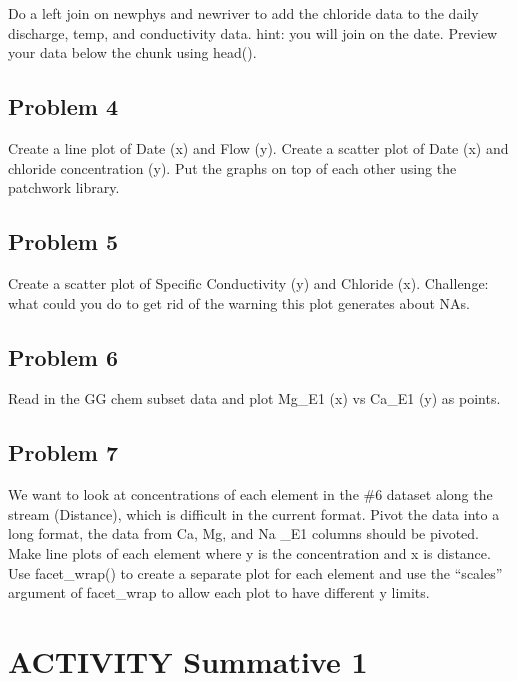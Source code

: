 \documentclass[
]{book}
\begin{document}
Do a left join on newphys and newriver to add the chloride data to the daily discharge, temp, and conductivity data. hint: you will join on the date. Preview your data below the chunk using head().

\hypertarget{problem-4-2}{%
\section{Problem 4}\label{problem-4-2}}

Create a line plot of Date (x) and Flow (y). Create a scatter plot of Date (x) and chloride concentration (y). Put the graphs on top of each other using the patchwork library.

\hypertarget{problem-5-2}{%
\section{Problem 5}\label{problem-5-2}}

Create a scatter plot of Specific Conductivity (y) and Chloride (x). Challenge: what could you do to get rid of the warning this plot generates about NAs.

\hypertarget{problem-6-2}{%
\section{Problem 6}\label{problem-6-2}}

Read in the GG chem subset data and plot Mg\_E1 (x) vs Ca\_E1 (y) as points.

\hypertarget{problem-7}{%
\section{Problem 7}\label{problem-7}}

We want to look at concentrations of each element in the \#6 dataset along the stream (Distance), which is difficult in the current format. Pivot the data into a long format, the data from Ca, Mg, and Na \_E1 columns should be pivoted. Make line plots of each element where y is the concentration and x is distance. Use facet\_wrap() to create a separate plot for each element and use the ``scales'' argument of facet\_wrap to allow each plot to have different y limits.

\hypertarget{Summative1}{%
\chapter{ACTIVITY Summative 1}\label{Summative1}}
\end{document}
